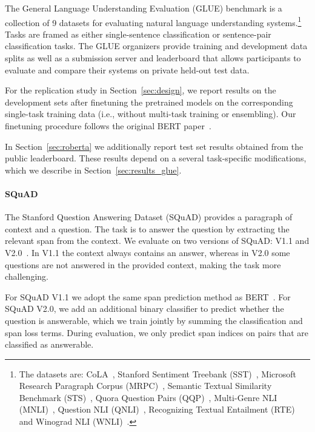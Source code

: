 The General Language Understanding Evaluation (GLUE) benchmark \cite{wang2019glue} is a collection of 9 datasets for evaluating natural language understanding systems.\footnote{The datasets are: CoLA~\cite{warstadt2018neural}, Stanford Sentiment Treebank (SST)~\cite{socher2013recursive}, Microsoft Research Paragraph Corpus (MRPC)~\cite{dolan2005automatically}, Semantic Textual Similarity Benchmark (STS)~\cite{agirre2007semantic}, Quora Question Pairs (QQP)~\cite{iyer2016quora}, Multi-Genre NLI (MNLI)~\cite{williams2018broad}, Question NLI (QNLI)~\cite{rajpurkar2016squad}, Recognizing Textual Entailment (RTE)~\cite{dagan2006pascal,bar2006second,giampiccolo2007third,bentivogli2009fifth} and Winograd NLI (WNLI)~\cite{levesque2011winograd}.}
Tasks are framed as either single-sentence classification or sentence-pair classification tasks.
The GLUE organizers provide training and development data splits as well as a submission server and leaderboard that allows participants to evaluate and compare their systems on private held-out test data.

For the replication study in Section~\ref{sec:design}, we report results on the development sets after finetuning the pretrained models on the corresponding single-task training data (i.e., without multi-task training or ensembling).
Our finetuning procedure follows the original BERT paper~\cite{devlin2018bert}.

In Section~\ref{sec:roberta} we additionally report test set results obtained from the public leaderboard. These results depend on a several task-specific modifications, which we describe in Section~\ref{sec:results_glue}.

\paragraph{SQuAD} \label{sec:squad}
The Stanford Question Answering Dataset (SQuAD) provides a paragraph of context and a  question.
The task is to answer the question by extracting the relevant span from the context.
We evaluate on two versions of SQuAD: V1.1 and V2.0~\cite{rajpurkar2016squad,rajpurkar2018know}.
In V1.1 the context always contains an answer, whereas in V2.0 some questions are not answered in the provided context, making the task more challenging.

For SQuAD V1.1 we adopt the same span prediction method as BERT~\cite{devlin2018bert}.
For SQuAD V2.0, we add an additional binary classifier to predict whether the question is answerable, which we train jointly by summing the classification and span loss terms.
During evaluation, we only predict span indices on pairs that are classified as answerable.

